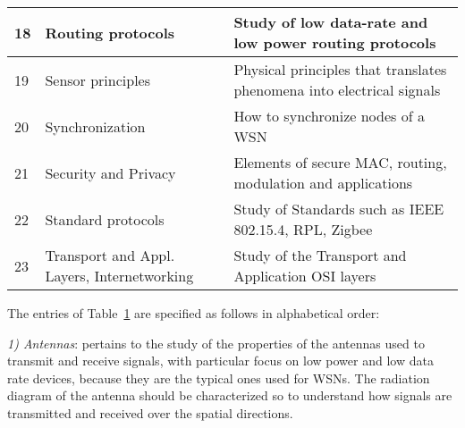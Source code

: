 \documentclass[onecolumn,12pt,draftclsnofoot,a4paper,peerreview]{IEEEtran}
\begin{document}
\begin{table}[t]
\begin{center}
\begin{tabular}{||  l || l  || l  ||  }
    \hline 18 & Routing protocols  & Study of low data-rate and low power routing protocols \\
    \hline 19 & Sensor principles  & Physical principles that translates phenomena into electrical signals \\
    \hline 20 & Synchronization  & How to synchronize nodes of a WSN \\
    \hline 21 & Security and Privacy & Elements of secure MAC, routing, modulation and applications \\
    \hline 22 & Standard protocols  & Study of Standards such as IEEE 802.15.4, RPL, Zigbee\\
     \hline 23 & Transport and Appl. Layers, Internetworking  & Study of the Transport and Application OSI layers\\
    \hline
  \end{tabular}
  \label{tab:topics}
\end{center}
\end{table}

The entries of Table~\ref{tab:topics} are specified as follows in alphabetical order: 

{\em 1) Antennas}: pertains to the study of the properties of the antennas used to transmit and receive signals, with particular focus on low power and low data rate devices, because they are the typical ones used for WSNs. The radiation diagram of the antenna should be characterized so to understand how signals are transmitted and received over the spatial directions. 
\end{document}
